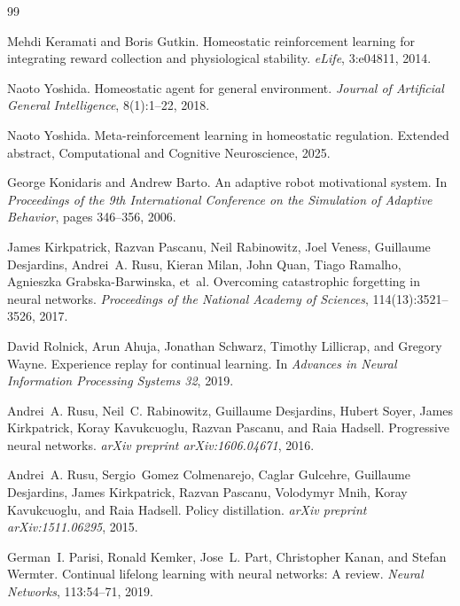 \documentclass{article}
\begin{document}

\begin{thebibliography}{99}

Mehdi Keramati and Boris Gutkin.
\newblock Homeostatic reinforcement learning for integrating reward collection
  and physiological stability.
\newblock \emph{eLife}, 3:e04811, 2014.

Naoto Yoshida.
\newblock Homeostatic agent for general environment.
\newblock \emph{Journal of Artificial General Intelligence}, 8(1):1--22, 2018.

Naoto Yoshida.
\newblock Meta-reinforcement learning in homeostatic regulation.
\newblock Extended abstract, Computational and Cognitive Neuroscience, 2025.

George Konidaris and Andrew Barto.
\newblock An adaptive robot motivational system.
\newblock In \emph{Proceedings of the 9th International Conference on the
  Simulation of Adaptive Behavior}, pages 346--356, 2006.

James Kirkpatrick, Razvan Pascanu, Neil Rabinowitz, Joel Veness, Guillaume
  Desjardins, Andrei~A. Rusu, Kieran Milan, John Quan, Tiago Ramalho, Agnieszka
  Grabska-Barwinska, et~al.
\newblock Overcoming catastrophic forgetting in neural networks.
\newblock \emph{Proceedings of the National Academy of Sciences},
  114(13):3521--3526, 2017.

David Rolnick, Arun Ahuja, Jonathan Schwarz, Timothy Lillicrap, and Gregory
  Wayne.
\newblock Experience replay for continual learning.
\newblock In \emph{Advances in Neural Information Processing Systems 32}, 2019.

Andrei~A. Rusu, Neil~C. Rabinowitz, Guillaume Desjardins, Hubert Soyer, James
  Kirkpatrick, Koray Kavukcuoglu, Razvan Pascanu, and Raia Hadsell.
\newblock Progressive neural networks.
\newblock \emph{arXiv preprint arXiv:1606.04671}, 2016.

Andrei~A. Rusu, Sergio~Gomez Colmenarejo, Caglar Gulcehre, Guillaume
  Desjardins, James Kirkpatrick, Razvan Pascanu, Volodymyr Mnih, Koray
  Kavukcuoglu, and Raia Hadsell.
\newblock Policy distillation.
\newblock \emph{arXiv preprint arXiv:1511.06295}, 2015.

German~I. Parisi, Ronald Kemker, Jose~L. Part, Christopher Kanan, and Stefan
  Wermter.
\newblock Continual lifelong learning with neural networks: A review.
\newblock \emph{Neural Networks}, 113:54--71, 2019.


\end{thebibliography}
\end{document}
